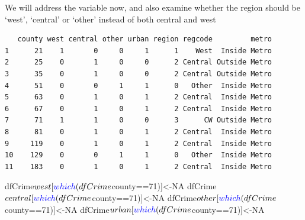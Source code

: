\documentclass[]{article}
\newenvironment{Shaded}{}{}
\newcommand{\CommentTok}[1]{\textcolor[rgb]{0.00,0.50,0.00}{#1}}
\newcommand{\DecValTok}[1]{#1}
\newcommand{\FloatTok}[1]{#1}
\newcommand{\KeywordTok}[1]{\textcolor[rgb]{0.00,0.00,1.00}{#1}}
\newcommand{\NormalTok}[1]{#1}
\newcommand{\OperatorTok}[1]{#1}
\newcommand{\OtherTok}[1]{\textcolor[rgb]{1.00,0.25,0.00}{#1}}
\newcommand{\StringTok}[1]{\textcolor[rgb]{0.00,0.50,0.50}{#1}}
\begin{document}
We will address the variable now, and also examine whether the region
should be `west', `central' or `other' instead of both central and west

\begin{Shaded}
\end{Shaded}

\begin{verbatim}
   county west central other urban region regcode         metro
1      21    1       0     0     1      1    West  Inside Metro
2      25    0       1     0     0      2 Central Outside Metro
3      35    0       1     0     0      2 Central Outside Metro
4      51    0       0     1     1      0   Other  Inside Metro
5      63    0       1     0     1      2 Central  Inside Metro
6      67    0       1     0     1      2 Central  Inside Metro
7      71    1       1     0     0      3      CW Outside Metro
8      81    0       1     0     1      2 Central  Inside Metro
9     119    0       1     0     1      2 Central  Inside Metro
10    129    0       0     1     1      0   Other  Inside Metro
11    183    0       1     0     1      2 Central  Inside Metro
\end{verbatim}

\begin{Shaded}
\begin{Highlighting}[]
\NormalTok{dfCrime}\OperatorTok{$}\NormalTok{west[}\KeywordTok{which}\NormalTok{(dfCrime}\OperatorTok{$}\NormalTok{county}\OperatorTok{==}\DecValTok{71}\NormalTok{)]<-}\OtherTok{NA}
\NormalTok{dfCrime}\OperatorTok{$}\NormalTok{central[}\KeywordTok{which}\NormalTok{(dfCrime}\OperatorTok{$}\NormalTok{county}\OperatorTok{==}\DecValTok{71}\NormalTok{)]<-}\OtherTok{NA}
\NormalTok{dfCrime}\OperatorTok{$}\NormalTok{other[}\KeywordTok{which}\NormalTok{(dfCrime}\OperatorTok{$}\NormalTok{county}\OperatorTok{==}\DecValTok{71}\NormalTok{)]<-}\OtherTok{NA}
\NormalTok{dfCrime}\OperatorTok{$}\NormalTok{urban[}\KeywordTok{which}\NormalTok{(dfCrime}\OperatorTok{$}\NormalTok{county}\OperatorTok{==}\DecValTok{71}\NormalTok{)]<-}\OtherTok{NA}
\end{Highlighting}
\end{Shaded}
\end{document}
